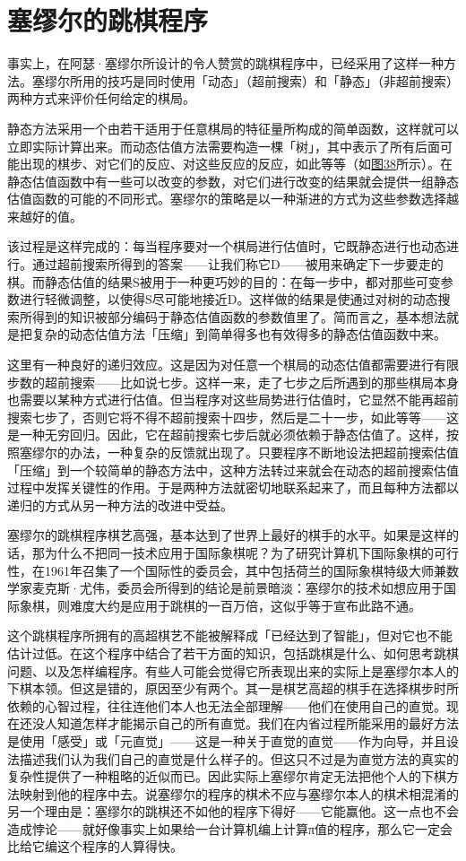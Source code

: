 \documentclass[
  12pt,
  twoside,
  openright,
  oldfontcommands,
]{memoir}
\begin{document}
\section{塞缪尔的跳棋程序}

事实上，在阿瑟·塞缪尔所设计的令人赞赏的跳棋程序中，已经采用了这样一种方法。塞缪尔所用的技巧是同时使用「动态」（超前搜索）和「静态」（非超前搜索）两种方式来评价任何给定的棋局。

静态方法采用一个由若干适用于任意棋局的特征量所构成的简单函数，这样就可以立即实际计算出来。而动态估值方法需要构造一棵「树」，其中表示了所有后面可能出现的棋步、对它们的反应、对这些反应的反应，如此等等（如\hyperref[fig:38]{图38}所示）。在静态估值函数中有一些可以改变的参数，对它们进行改变的结果就会提供一组静态估值函数的可能的不同形式。塞缪尔的策略是以一种渐进的方式为这些参数选择越来越好的值。

该过程是这样完成的：每当程序要对一个棋局进行估值时，它既静态进行也动态进行。通过超前搜索所得到的答案------让我们称它D------被用来确定下一步要走的棋。而静态估值的结果S被用于一种更巧妙的目的：在每一步中，都对那些可变参数进行轻微调整，以使得S尽可能地接近D。这样做的结果是使通过对树的动态搜索所得到的知识被部分编码于静态估值函数的参数值里了。简而言之，基本想法就是把复杂的动态估值方法「压缩」到简单得多也有效得多的静态估值函数中来。

这里有一种良好的递归效应。这是因为对任意一个棋局的动态估值都需要进行有限步数的超前搜索------比如说七步。这样一来，走了七步之后所遇到的那些棋局本身也需要以某种方式进行估值。但当程序对这些局势进行估值时，它显然不能再超前搜索七步了，否则它将不得不超前搜索十四步，然后是二十一步，如此等等------这是一种无穷回归。因此，它在超前搜索七步后就必须依赖于静态估值了。这样，按照塞缪尔的办法，一种复杂的反馈就出现了。只要程序不断地设法把超前搜索估值「压缩」到一个较简单的静态方法中，这种方法转过来就会在动态的超前搜索估值过程中发挥关键性的作用。于是两种方法就密切地联系起来了，而且每种方法都以递归的方式从另一种方法的改进中受益。

塞缪尔的跳棋程序棋艺高强，基本达到了世界上最好的棋手的水平。如果是这样的话，那为什么不把同一技术应用于国际象棋呢？为了研究计算机下国际象棋的可行性，在1961年召集了一个国际性的委员会，其中包括荷兰的国际象棋特级大师兼数学家麦克斯·尤伟，委员会所得到的结论是前景暗淡：塞缪尔的技术如想应用于国际象棋，则难度大约是应用于跳棋的一百万倍，这似乎等于宣布此路不通。

这个跳棋程序所拥有的高超棋艺不能被解释成「已经达到了智能」，但对它也不能估计过低。在这个程序中结合了若干方面的知识，包括跳棋是什么、如何思考跳棋问题、以及怎样编程序。有些人可能会觉得它所表现出来的实际上是塞缪尔本人的下棋本领。但这是错的，原因至少有两个。其一是棋艺高超的棋手在选择棋步时所依赖的心智过程，往往连他们本人也无法全部理解------他们在使用自己的直觉。现在还没人知道怎样才能揭示自己的所有直觉。我们在内省过程所能采用的最好方法是使用「感受」或「元直觉」------这是一种关于直觉的直觉------作为向导，并且设法描述我们认为我们自己的直觉是什么样子的。但这只不过是为直觉方法的真实的复杂性提供了一种粗略的近似而已。因此实际上塞缪尔肯定无法把他个人的下棋方法映射到他的程序中去。说塞缪尔的程序的棋术不应与塞缪尔本人的棋术相混淆的另一个理由是：塞缪尔的跳棋还不如他的程序下得好------它能赢他。这一点也不会造成悖论------就好像事实上如果给一台计算机编上计算π值的程序，那么它一定会比给它编这个程序的人算得快。
\end{document}
